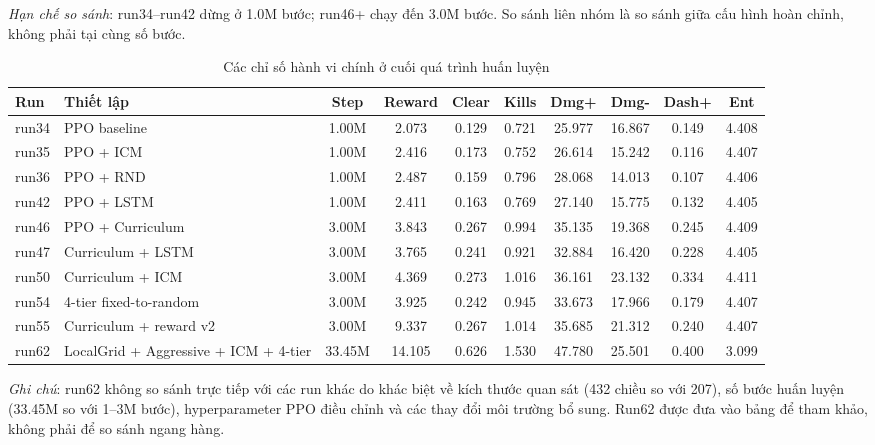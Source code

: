 \textit{Hạn chế so sánh}: run34--run42 dừng ở 1.0M bước; run46+ chạy đến 3.0M bước. So sánh liên nhóm là so sánh giữa cấu hình hoàn chỉnh, không phải tại cùng số bước.

\begin{table}[H]
    \centering
    \scriptsize
    \setlength{\tabcolsep}{4pt}
    \renewcommand{\arraystretch}{1.15}
    \caption{Các chỉ số hành vi chính ở cuối quá trình huấn luyện}
    \label{tab:run_metrics_main}
    \begin{tabular}{l p{3.0cm} c c c c c c c c}
        \toprule
        \textbf{Run} & \textbf{Thiết lập} & \textbf{Step} & \textbf{Reward} & \textbf{Clear} & \textbf{Kills} & \textbf{Dmg+} & \textbf{Dmg-} & \textbf{Dash+} & \textbf{Ent} \\
        \midrule
        run34 & PPO baseline & 1.00M & 2.073 & 0.129 & 0.721 & 25.977 & 16.867 & 0.149 & 4.408 \\
        run35 & PPO + ICM & 1.00M & 2.416 & 0.173 & 0.752 & 26.614 & 15.242 & 0.116 & 4.407 \\
        run36 & PPO + RND & 1.00M & 2.487 & 0.159 & 0.796 & 28.068 & 14.013 & 0.107 & 4.406 \\
        run42 & PPO + LSTM & 1.00M & 2.411 & 0.163 & 0.769 & 27.140 & 15.775 & 0.132 & 4.405 \\
        run46 & PPO + Curriculum & 3.00M & 3.843 & 0.267 & 0.994 & 35.135 & 19.368 & 0.245 & 4.409 \\
        run47 & Curriculum + LSTM & 3.00M & 3.765 & 0.241 & 0.921 & 32.884 & 16.420 & 0.228 & 4.405 \\
        run50 & Curriculum + ICM & 3.00M & 4.369 & 0.273 & 1.016 & 36.161 & 23.132 & 0.334 & 4.411 \\
        run54 & 4-tier fixed-to-random & 3.00M & 3.925 & 0.242 & 0.945 & 33.673 & 17.966 & 0.179 & 4.407 \\
        run55 & Curriculum + reward v2 & 3.00M & 9.337 & 0.267 & 1.014 & 35.685 & 21.312 & 0.240 & 4.407 \\
        run62 & LocalGrid + Aggressive + ICM + 4-tier & 33.45M & 14.105 & 0.626 & 1.530 & 47.780 & 25.501 & 0.400 & 3.099 \\
        \bottomrule
    \end{tabular}
    \vspace{4pt}
    \begin{minipage}{0.96\textwidth}
        \small\textit{Ghi chú}: run62 không so sánh trực tiếp với các run khác do khác biệt về kích thước quan sát (432 chiều so với 207), số bước huấn luyện (33.45M so với 1--3M bước), hyperparameter PPO điều chỉnh và các thay đổi môi trường bổ sung. Run62 được đưa vào bảng để tham khảo, không phải để so sánh ngang hàng.
    \end{minipage}
\end{table}

